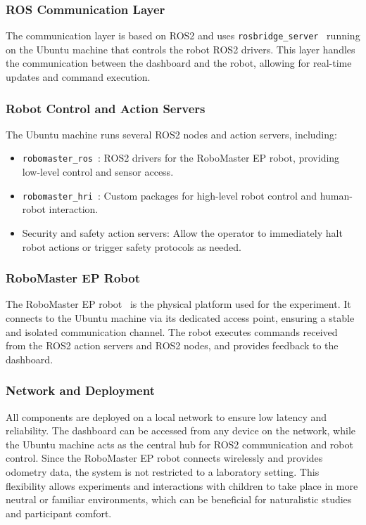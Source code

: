 \documentclass[a4paper]{usiinfbachelorproject}
\begin{document}
\subsubsection*{\textbf{ROS Communication Layer}}
The communication layer is based on ROS2 and uses \texttt{rosbridge\_server}~\cite{rosbridge} running on the Ubuntu machine that controls the robot ROS2 drivers.
This layer handles the communication between the dashboard and the robot, allowing for real-time updates and command execution.

\subsubsection*{\textbf{Robot Control and Action Servers}}
The Ubuntu machine runs several ROS2 nodes and action servers, including:
\begin{itemize}
    \item \texttt{robomaster\_ros}~\cite{frovaaa2025robomaster}: ROS2 drivers for the RoboMaster EP robot, providing low-level control and sensor access.
    \item \texttt{robomaster\_hri}~\cite{frovaaa2025robomasterhri}: Custom packages for high-level robot control and human-robot interaction.
    \item Security and safety action servers: Allow the operator to immediately halt robot actions or trigger safety protocols as needed.
\end{itemize}

\subsubsection*{\textbf{RoboMaster EP Robot}}
The RoboMaster EP robot~\cite{djirobomasterep} is the physical platform used for the experiment.
It connects to the Ubuntu machine via its dedicated access point, ensuring a stable and isolated communication channel.
The robot executes commands received from the ROS2 action servers and ROS2 nodes, and provides feedback to the dashboard.


\subsubsection*{\textbf{Network and Deployment}}
All components are deployed on a local network to ensure low latency and reliability.
The dashboard can be accessed from any device on the network, while the Ubuntu machine acts as the central hub for ROS2 communication and robot control.
Since the RoboMaster EP robot connects wirelessly and provides odometry data, the system is not restricted to a laboratory setting.
This flexibility allows experiments and interactions with children to take place in more neutral or familiar environments, which can be beneficial for naturalistic studies and participant comfort.
\end{document}

